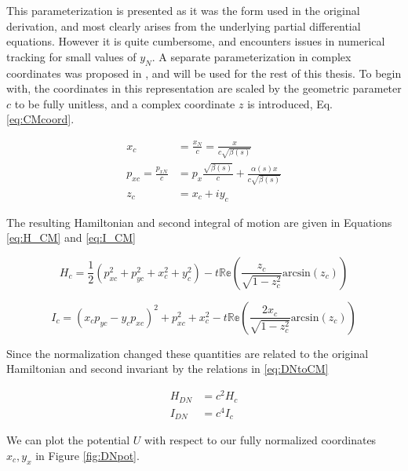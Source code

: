 This parameterization is presented as it was the form used in the original derivation, and most clearly arises from the underlying partial differential equations. However it is quite cumbersome, and encounters issues in numerical tracking for small values of $y_N$. A separate parameterization in complex coordinates was proposed in \cite{Mitchell}, and will be used for the rest of this thesis. To begin with, the coordinates in this representation are scaled by the geometric parameter $c$ to be fully unitless, and a complex coordinate $z$ is introduced, Eq. \ref{eq:CMcoord}.

\begin{equation} \label{eq:CMcoord}
\begin{split}
	x_c &= \frac{x_N}{c} = \frac{x}{c\sqrt{\beta(s)}}\\
	p_{xc} = \frac{p_{xN}}{c} &= p_x\frac{\sqrt{\beta(s)}}{c} + \frac{\alpha(s)x}{c\sqrt{\beta(s)}}\\
	z_c &= x_c + iy_c
\end{split}
\end{equation}

The resulting Hamiltonian and second integral of motion are given in Equations \ref{eq:H_CM} and \ref{eq:I_CM}

\begin{equation} \label{eq:H_CM}
H_c = \frac{1}{2}\left( p_{xc}^2 + p_{yc}^2 + x_c^2 + y_c^2 \right) - t \mathbb{Re}\left(\frac{z_c}{\sqrt{1-z_c^2}}\textrm{arcsin}(z_c)\right)
\end{equation}

\begin{equation} \label{eq:I_CM}
I_c = (x_c p_{yc} - y_c p_{xc})^2 + p_{xc}^2 + x_c^2 - t\mathbb{Re}\left(\frac{2 x_c}{\sqrt{1-z_c^2}}\textrm{arcsin}(z_c)\right)
\end{equation}

Since the normalization changed these quantities are related to the original Hamiltonian and second invariant by the relations in \ref{eq:DNtoCM}

\begin{equation} \label{eq:DNtoCM}
\begin{split}
	H_{DN} &= c^2 H_c \\
	I_{DN} &= c^4 I_c
\end{split}
\end{equation}

We can plot the potential $U$ with respect to our fully normalized coordinates $x_c,y_x$ in Figure \ref{fig:DNpot}.

